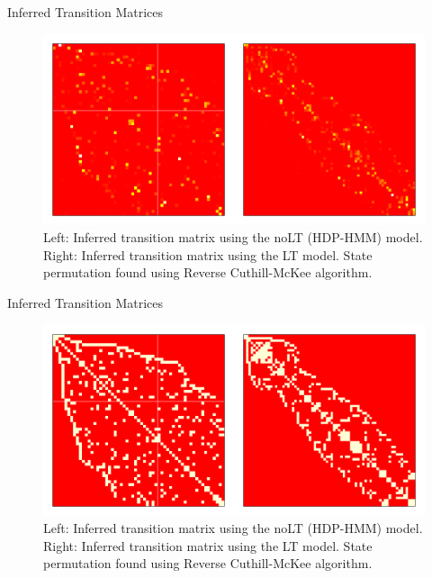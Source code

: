 \documentclass[11pt, mathserif, handout, table]{beamer}
\begin{document}
\begin{frame}{Inferred Transition Matrices}
\begin{figure}
\includegraphics[width=\textwidth]{img/block_diag/A01}
\caption{Left: Inferred transition matrix using the noLT (HDP-HMM)
  model. Right: Inferred transition matrix using the LT model.  State
  permutation found using Reverse Cuthill-McKee algorithm.}
\end{figure}
\end{frame}

\begin{frame}{Inferred Transition Matrices}
\begin{figure}
\includegraphics[width=\textwidth]{img/block_diag/A01-binary}
\caption{Left: Inferred transition matrix using the noLT (HDP-HMM)
  model. Right: Inferred transition matrix using the LT model.  State
  permutation found using Reverse Cuthill-McKee algorithm.}
\end{figure}
\end{frame}
\end{document}

